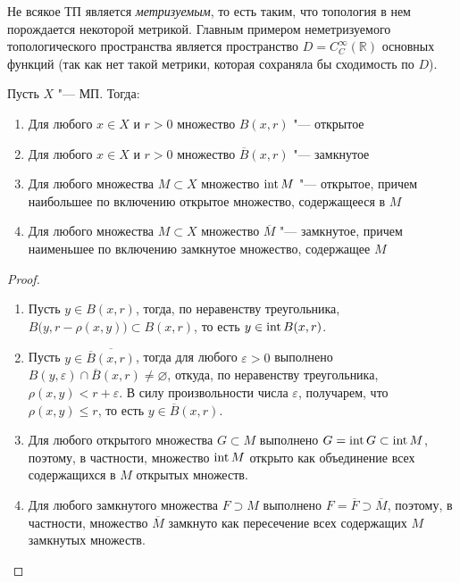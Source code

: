 \begin{note}
	Не всякое ТП является \textit{метризуемым}, то есть таким, что топология в нем порождается некоторой метрикой. Главным примером неметризуемого топологического пространства является пространство $D = C_C^{\infty}(\mathbb{R})$ основных функций (так как нет такой метрики, которая сохраняла бы сходимость по $D$).
\end{note}

\begin{theorem}\label{thm1.3}
	Пусть $X$ "--- МП. Тогда:
	\begin{enumerate}
		\item Для любого $x \in X$ и $r > 0$ множество $B(x, r)$ "--- открытое
		\item Для любого $x \in X$ и $r > 0$ множество $\overline B(x, r)$ "--- замкнутое
		\item Для любого множества $M \subset X$ множество $\operatorname{int} M$ "--- открытое, причем наибольшее по включению открытое множество, содержащееся в $M$
		\item Для любого множества $M \subset X$ множество $\overline M$ "--- замкнутое, причем наименьшее по включению замкнутое множество, содержащее $M$
	\end{enumerate}
\end{theorem}

\begin{proof}~
	\begin{enumerate}
		\item Пусть $y \in B(x, r)$, тогда, по неравенству треугольника, $B\big(y, r - \rho(x, y)\big) \subset B(x, r)$, то есть $y \in \operatorname{int} B(x, r)$.
		
		\item Пусть $y \in \overline{\overline B(x, r)}$, тогда для любого $\varepsilon > 0$ выполнено $B(y, \varepsilon) \cap \overline B(x, r) \neq \varnothing$, откуда, по неравенству треугольника, $\rho(x, y) < r + \varepsilon$. В силу произвольности числа $\varepsilon$, получарем, что $\rho(x, y) \leqslant r$, то есть $y \in \overline B(x, r)$.
		
		\item Для любого открытого множества $G \subset M$ выполнено $G = \operatorname{int} G \subset \operatorname{int} M$, поэтому, в частности, множество $\operatorname{int} M$ открыто как объединение всех содержащихся в $M$ открытых множеств.
  
		\item Для любого замкнутого множества $F \supset M$ выполнено $F = \overline F \supset \overline M$, поэтому, в частности, множество $\overline M$ замкнуто как пересечение всех содержащих $M$ замкнутых множеств.\qedhere
	\end{enumerate}
\end{proof}

